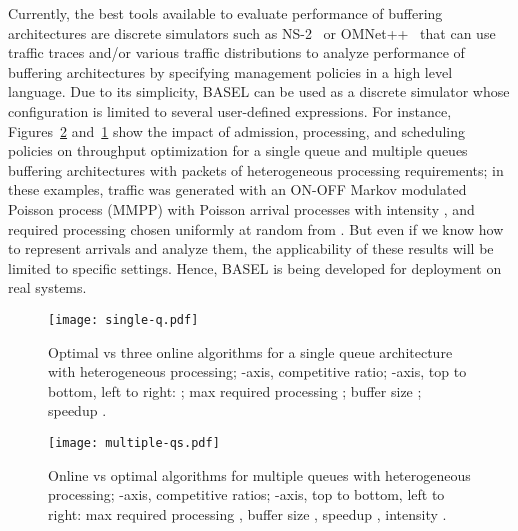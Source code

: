 \documentclass{article}
\def\legendsize{\scriptsize}
\newcommand{\barch}{BASEL}
\begin{document}
Currently, the best tools available to evaluate performance of buffering architectures are discrete simulators such as 
NS-2~\cite{ns2} or OMNet++~\cite{omnnet} that can use traffic traces and/or various traffic distributions to 
analyze performance of buffering architectures by specifying management policies in a high level language. 
Due to its simplicity, \barch{} can be used as a discrete simulator whose configuration is limited to several
user-defined expressions. 
For instance,
Figures~\ref{fig:sim-queues} and~\ref{fig:sim-queue} show the impact
of admission, processing, and scheduling policies on throughput
optimization for a single queue and multiple queues buffering
architectures with packets of heterogeneous processing requirements;
in these examples, traffic was generated with an ON-OFF
Markov modulated Poisson process (MMPP) with Poisson arrival processes
with intensity , and required processing chosen uniformly at
random from . But even if we know how to represent arrivals and
analyze them, the applicability of these results will be limited to
specific settings. Hence, \barch{} is being developed for deployment on real
systems.

\begin{figure}
\centerline{
\texttt{[image: single-q.pdf]}
}
\vspace{-10pt}
\caption{Optimal vs three online algorithms for a single queue architecture with heterogeneous processing;
-axis, competitive ratio; -axis, top to bottom, left to right: ; max required processing ; 
buffer size ; speedup .}
\label{fig:sim-queue}
\end{figure}





\def\legendsize{\scriptsize}

\begin{figure}
\centerline{
\texttt{[image: multiple-qs.pdf]}
}
\vspace{-10pt}
\caption{Online vs optimal algorithms for multiple que\-ues with heterogeneous processing;
-axis, competitive ratios; -axis, top to bottom, left to right: max required processing , buffer size , speedup , intensity .}
\label{fig:sim-queues}
\end{figure}
\end{document}
